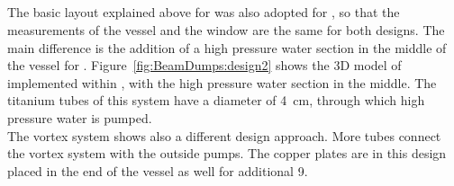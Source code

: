 \subsection{\designtwo}
\label{BeamDumps:design:design2}
The basic layout explained above for \designone was also adopted for \designtwo, so that the measurements of the vessel and the window are the same for both designs.
The main difference is the addition of a high pressure water section in the middle of the vessel  for \designtwo.
Figure~\ref{fig:BeamDumps:design2} shows the 3D model of \designtwo implemented within \flair, with the high pressure water section in the middle. 
The titanium tubes of this system have a diameter of \SI{4}{\centi\meter}, through which high pressure water is pumped.
\\The vortex system shows also a different design approach.
More tubes connect the vortex system with the outside pumps.
The copper plates are in this design placed in the end of the vessel as well for additional \SI{9}{\xzero}.

